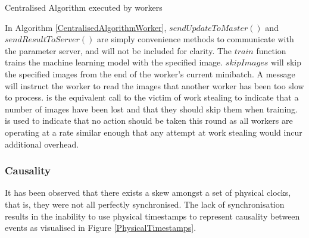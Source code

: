 \documentclass[12pt]{article}
\begin{document}
\IncMargin{1em}
\begin{algorithm}[H]
 \BlankLine
 \BlankLine
 \BlankLine
 \setcounter{AlgoLine}{0}
 \BlankLine
 \BlankLine
 \BlankLine
 \setcounter{AlgoLine}{0}
 \BlankLine
 \BlankLine
 \BlankLine
 \setcounter{AlgoLine}{0}
 \BlankLine
 \caption{Centralised Algorithm executed by workers}
 \label{CentralisedAlgorithmWorker}
\end{algorithm}
\DecMargin{1em}
\medskip

In Algorithm \ref{CentralisedAlgorithmWorker}, $sendUpdateToMaster()$ and $sendResultToServer()$ are simply convenience methods to communicate with the parameter server, and will not be included for clarity. The $train$ function trains the machine learning model with the specified image. $skipImages$ will skip the specified images from the end of the worker's current minibatch. A  message will instruct the worker to read the images that another worker has been too slow to process.  is the equivalent call to the victim of work stealing to indicate that a number of images have been lost and that they should skip them when training.  is used to indicate that no action should be taken this round as all workers are operating at a rate similar enough that any attempt at work stealing would incur additional overhead.

\subsubsection{Causality}
It has been observed that there exists a skew amongst a set of physical clocks, that is, they were not all perfectly synchronised. The lack of synchronisation results in the inability to use physical timestamps to represent causality between events as visualised in Figure \ref{PhysicalTimestamps}.
\end{document}
